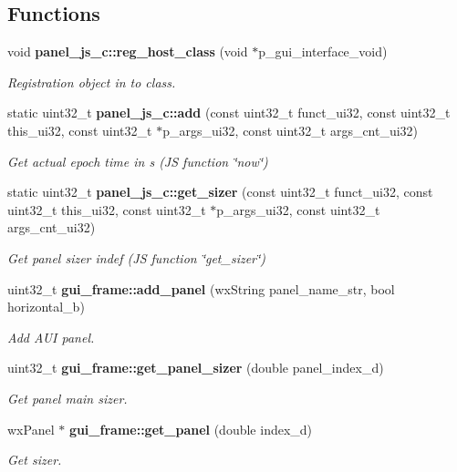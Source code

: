 \subsection*{Functions}
\begin{DoxyCompactItemize}
\item 
void \textbf{ panel\+\_\+js\+\_\+c\+::reg\+\_\+host\+\_\+class} (void $\ast$p\+\_\+gui\+\_\+interface\+\_\+void)
\begin{DoxyCompactList}\small\item\em Registration object in to class. \end{DoxyCompactList}\item 
static uint32\+\_\+t \textbf{ panel\+\_\+js\+\_\+c\+::add} (const uint32\+\_\+t funct\+\_\+ui32, const uint32\+\_\+t this\+\_\+ui32, const uint32\+\_\+t $\ast$p\+\_\+args\+\_\+ui32, const uint32\+\_\+t args\+\_\+cnt\+\_\+ui32)
\begin{DoxyCompactList}\small\item\em Get actual epoch time in s (JS function \char`\"{}now\char`\"{}) \end{DoxyCompactList}\item 
static uint32\+\_\+t \textbf{ panel\+\_\+js\+\_\+c\+::get\+\_\+sizer} (const uint32\+\_\+t funct\+\_\+ui32, const uint32\+\_\+t this\+\_\+ui32, const uint32\+\_\+t $\ast$p\+\_\+args\+\_\+ui32, const uint32\+\_\+t args\+\_\+cnt\+\_\+ui32)
\begin{DoxyCompactList}\small\item\em Get panel sizer indef (JS function \char`\"{}get\+\_\+sizer\char`\"{}) \end{DoxyCompactList}\item 
uint32\+\_\+t \textbf{ gui\+\_\+frame\+::add\+\_\+panel} (wx\+String panel\+\_\+name\+\_\+str, bool horizontal\+\_\+b)
\begin{DoxyCompactList}\small\item\em Add A\+UI panel. \end{DoxyCompactList}\item 
uint32\+\_\+t \textbf{ gui\+\_\+frame\+::get\+\_\+panel\+\_\+sizer} (double panel\+\_\+index\+\_\+d)
\begin{DoxyCompactList}\small\item\em Get panel main sizer. \end{DoxyCompactList}\item 
wx\+Panel $\ast$ \textbf{ gui\+\_\+frame\+::get\+\_\+panel} (double index\+\_\+d)
\begin{DoxyCompactList}\small\item\em Get sizer. \end{DoxyCompactList}\end{DoxyCompactItemize}
